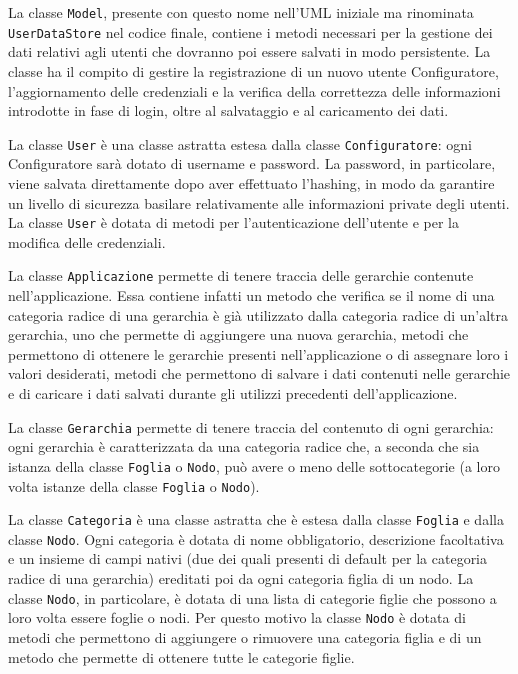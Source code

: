 La classe \texttt{Model}, presente con questo nome nell'UML iniziale ma rinominata \texttt{UserDataStore} nel codice finale, contiene i metodi necessari per la gestione dei dati relativi agli utenti che dovranno poi essere salvati in modo persistente. La classe ha il compito di gestire la registrazione di un nuovo utente Configuratore, l'aggiornamento delle credenziali e la verifica della correttezza delle informazioni introdotte in fase di login, oltre al salvataggio e al caricamento dei dati. 

La classe \texttt{User} è una classe astratta estesa dalla classe \texttt{Configuratore}: ogni Configuratore sarà dotato di username e password. La password, in particolare, viene salvata direttamente dopo aver effettuato l'hashing, in modo da garantire un livello di sicurezza basilare relativamente alle informazioni private degli utenti. La classe \texttt{User} è dotata di metodi per l'autenticazione dell'utente e per la modifica delle credenziali.

La classe \texttt{Applicazione} permette di tenere traccia delle gerarchie contenute nell'applicazione. 
Essa contiene infatti un metodo che verifica se il nome di una categoria radice di una gerarchia è già utilizzato dalla categoria radice di un'altra gerarchia, uno che permette di aggiungere una nuova gerarchia, metodi che permettono di ottenere le gerarchie presenti nell'applicazione o di assegnare loro i valori desiderati, metodi che permettono di salvare i dati contenuti nelle gerarchie e di caricare i dati salvati durante gli utilizzi precedenti dell'applicazione.

La classe \texttt{Gerarchia} permette di tenere traccia del contenuto di ogni gerarchia: ogni gerarchia è caratterizzata da una categoria radice che, a seconda che sia istanza della classe \texttt{Foglia} o \texttt{Nodo}, può avere o meno delle sottocategorie (a loro volta istanze della classe \texttt{Foglia} o \texttt{Nodo}). 

La classe \texttt{Categoria} è una classe astratta che è estesa dalla classe \texttt{Foglia} e dalla classe \texttt{Nodo}. Ogni categoria è dotata di nome obbligatorio, descrizione facoltativa e un insieme di campi nativi (due dei quali presenti di default per la categoria radice di una gerarchia) ereditati poi da ogni categoria figlia di un nodo.
La classe \texttt{Nodo}, in particolare, è dotata di una lista di categorie figlie che possono a loro volta essere foglie o nodi. Per questo motivo la classe \texttt{Nodo} è dotata di metodi che permettono di aggiungere o rimuovere una categoria figlia e di un metodo che permette di ottenere tutte le categorie figlie.

